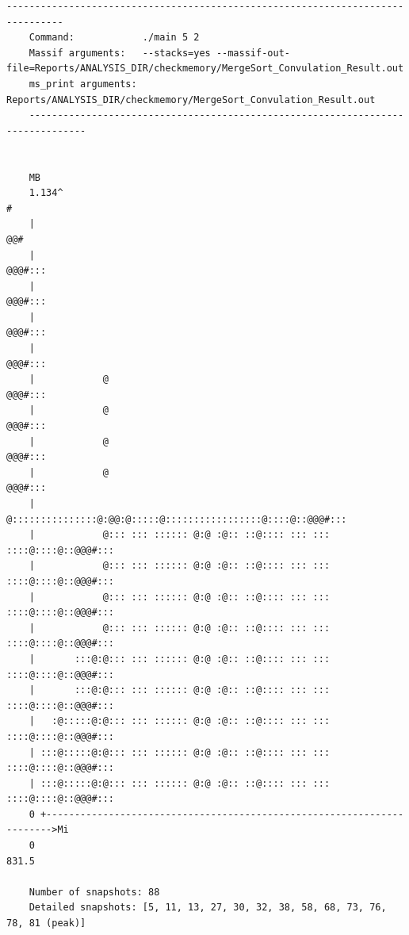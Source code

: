 \begin{lstlisting}[style=StyleResult, language=Result, basicstyle=\fontsize{9}{10}\selectfont\ttfamily, caption={Kiểm tra sử dụng bộ nhớ khi sử dụng MergeSort kèm theo Framework.}]
	--------------------------------------------------------------------------------
	Command:            ./main 5 2
	Massif arguments:   --stacks=yes --massif-out-file=Reports/ANALYSIS_DIR/checkmemory/MergeSort_Convulation_Result.out
	ms_print arguments: Reports/ANALYSIS_DIR/checkmemory/MergeSort_Convulation_Result.out
	--------------------------------------------------------------------------------
	
	
	MB
	1.134^                                                               #   
	|                                                                  @@#   
	|                                                                 @@@#:::
	|                                                                 @@@#:::
	|                                                                 @@@#:::
	|                                                                 @@@#:::
	|            @                                                    @@@#:::
	|            @                                                    @@@#:::
	|            @                                                    @@@#:::
	|            @                                                    @@@#:::
	|            @:::::::::::::::@:@@:@:::::@:::::::::::::::::@::::@::@@@#:::
	|            @::: ::: :::::: @:@ :@:: ::@:::: ::: ::: ::::@::::@::@@@#:::
	|            @::: ::: :::::: @:@ :@:: ::@:::: ::: ::: ::::@::::@::@@@#:::
	|            @::: ::: :::::: @:@ :@:: ::@:::: ::: ::: ::::@::::@::@@@#:::
	|            @::: ::: :::::: @:@ :@:: ::@:::: ::: ::: ::::@::::@::@@@#:::
	|       :::@:@::: ::: :::::: @:@ :@:: ::@:::: ::: ::: ::::@::::@::@@@#:::
	|       :::@:@::: ::: :::::: @:@ :@:: ::@:::: ::: ::: ::::@::::@::@@@#:::
	|   :@:::::@:@::: ::: :::::: @:@ :@:: ::@:::: ::: ::: ::::@::::@::@@@#:::
	| :::@:::::@:@::: ::: :::::: @:@ :@:: ::@:::: ::: ::: ::::@::::@::@@@#:::
	| :::@:::::@:@::: ::: :::::: @:@ :@:: ::@:::: ::: ::: ::::@::::@::@@@#:::
	0 +----------------------------------------------------------------------->Mi
	0                                                                   831.5
	
	Number of snapshots: 88
	Detailed snapshots: [5, 11, 13, 27, 30, 32, 38, 58, 68, 73, 76, 78, 81 (peak)]
\end{lstlisting}